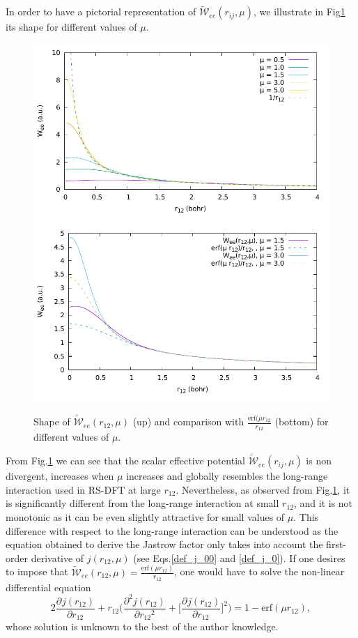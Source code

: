 \documentclass[aip,jcp,reprint,noshowkeys,superscriptaddress]{revtex4-1}
\newcommand{\deriv}[3]{\frac{\partial^{#3} #1}{\partial {#2}^{#3}}}
\begin{document}
In order to have a pictorial representation of $ \tilde{\mathcal{W}}_{ee}(r_{ij},\mu)$, we illustrate in Fig\ref{fig_wee_mu} its shape for different values of $\mu$. 
\begin{figure}
 \label{fig_wee_mu}
        \includegraphics[width=0.45\linewidth]{w_ee.pdf}
        \includegraphics[width=0.45\linewidth]{w_ee_bis.pdf}\\
        \caption{Shape of $\tilde{\mathcal{W}}_{ee}(r_{12},\mu)$ (up) and comparison with $\frac{\text{erf}(\mu r_{12}}{r_{12}}$ (bottom) for different values of $\mu$.}
\end{figure}
From  Fig.\ref{fig_wee_mu} we can see that the scalar effective potential $ \tilde{\mathcal{W}}_{ee}(r_{ij},\mu)$ 
is non divergent, increases when $\mu$ increases and globally resembles the long-range interaction used in RS-DFT at large $r_{12}$. 
Nevertheless, as observed from Fig.\ref{fig_wee_mu}, it is significantly different 
from the long-range interaction at small $r_{12}$, 
and it is not monotonic as it can be even slightly attractive for small values of $\mu$. 
This difference with respect to the long-range interaction can be understood as the equation obtained to derive the Jastrow factor only takes into account the first-order derivative of $j(r_{12},\mu)$ (see Eqs.\eqref{def_j_00} and \eqref{def_j_0}). 
If one desires to impose that $\tilde{\mathcal{W}}_{ee}(r_{12},\mu) = \frac{\text{erf}(\mu r_{12})}{r_{12}}$, one would have to solve the non-linear differential equation 
\begin{equation}
 2 \deriv{j(r_{12})}{r_{12}}{} + r_{12} \bigg( \deriv{j(r_{12})}{r_{12}}{2} + \bigg[ \deriv{j(r_{12})}{r_{12}}{} \bigg]^2\bigg) = 1 - \text{erf}(\mu r_{12}), 
\end{equation}
whose solution is unknown to the best of the author knowledge. 
\end{document}
